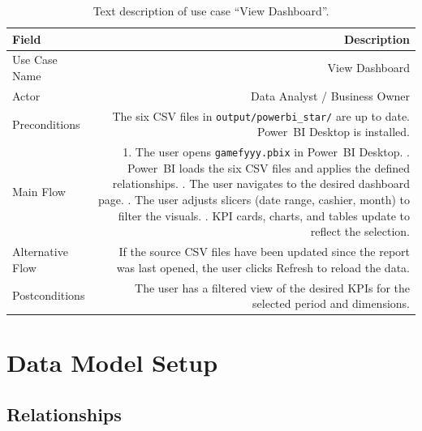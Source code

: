 \documentclass[12pt, a4paper]{report}
\begin{document}
\begin{table}[H]
\centering
\caption{Text description of use case ``View Dashboard''.\label{tab:uc_dashboard}}
\begin{tabular}{L R}
  \toprule
  \textbf{Field} & \textbf{Description} \\
  \midrule
  Use Case Name  & View Dashboard \\
  Actor          & Data Analyst / Business Owner \\
  Preconditions  & The six CSV files in \texttt{output/powerbi\_star/} are up
                   to date. Power~BI Desktop is installed. \\
  Main Flow      & 1. The user opens \texttt{gamefyyy.pbix} in Power~BI Desktop. . Power~BI loads the six CSV files and applies the defined
                      relationships. . The user navigates to the desired dashboard page. . The user adjusts slicers (date range, cashier, month) to
                      filter the visuals. . KPI cards, charts, and tables update to reflect the
                      selection. \\
  Alternative Flow & If the source CSV files have been updated since the report
                   was last opened, the user clicks Refresh to reload the data. \\
  Postconditions & The user has a filtered view of the desired KPIs for the
                   selected period and dimensions. \\
  \bottomrule
\end{tabular}
\end{table}


\section{Data Model Setup}

\subsection{Relationships}
\end{document}
